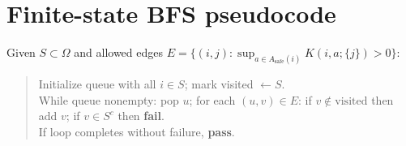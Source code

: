 \documentclass[11pt]{article}
\theoremstyle{plain}
\theoremstyle{definition}
\theoremstyle{remark}
\begin{document}
\section{Finite-state BFS pseudocode}

Given $S\subset \Omega$ and allowed edges $E=\{(i,j): \sup_{a\in A_{\mathrm{safe}}(i)} K(i,a;\{j\})>0\}$:
\begin{quote}
Initialize queue with all $i\in S$; mark visited $\gets S$. \\
While queue nonempty: pop $u$; for each $(u,v)\in E$: if $v\notin \mathrm{visited}$ then add $v$; if $v\in S^c$ then \textbf{fail}. \\
If loop completes without failure, \textbf{pass}.
\end{quote}
\end{document}
